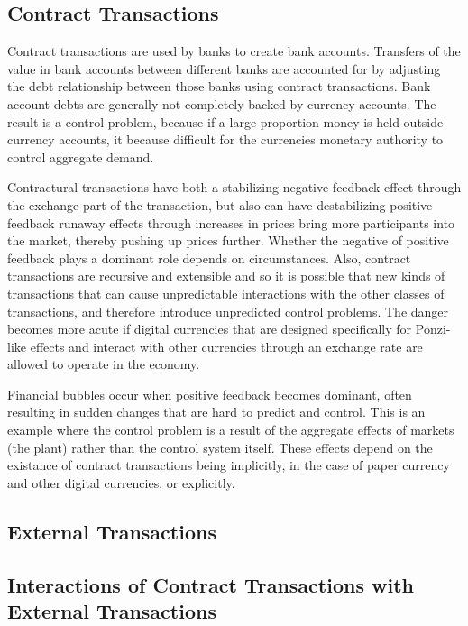 \subsection{Contract Transactions}

Contract transactions are used by banks to create bank accounts. Transfers of the value in bank
accounts between different banks are accounted for by adjusting the debt relationship between those
banks using contract transactions. Bank account debts are generally not completely backed by
currency accounts. The result is a control problem, because if a large proportion money is held
outside currency accounts, it because difficult for the currencies monetary authority to control
aggregate demand.

Contractural transactions have both a stabilizing negative feedback effect through the exchange part
of the transaction, but also can have destabilizing positive feedback runaway effects through
increases in prices bring more participants into the market, thereby pushing up prices further.
Whether the negative of positive feedback plays a dominant role depends on circumstances. Also,
contract transactions are recursive and extensible and so it is possible that new kinds of
transactions that can cause unpredictable interactions with the other classes of transactions, and
therefore introduce unpredicted control problems. The danger becomes more acute if digital
currencies that are designed specifically for Ponzi-like effects and interact with other currencies
through an exchange rate are allowed to operate in the economy.

Financial bubbles occur when positive feedback becomes dominant, often resulting in sudden changes
that are hard to predict and control. This is an example where the control problem is a result of
the aggregate effects of markets (the plant) rather than the control system itself. These effects
depend on the existance of contract transactions being implicitly, in the case of paper currency and
other digital currencies, or explicitly.

\subsection{External Transactions}

\subsection{Interactions of Contract Transactions with External Transactions}

